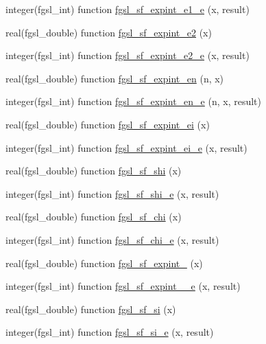 \begin{DoxyCompactItemize}
\item 
integer(fgsl\-\_\-int) function \hyperlink{specfunc_8finc_a16a9e5c0464dbb48ed274a8873ebbfda}{fgsl\-\_\-sf\-\_\-expint\-\_\-e1\-\_\-e} (x, result)
\item 
real(fgsl\-\_\-double) function \hyperlink{specfunc_8finc_ab6079b2df39d2fb6a3bfd9819f6212e6}{fgsl\-\_\-sf\-\_\-expint\-\_\-e2} (x)
\item 
integer(fgsl\-\_\-int) function \hyperlink{specfunc_8finc_a3e069fda991712e2b6351aaa26c2189a}{fgsl\-\_\-sf\-\_\-expint\-\_\-e2\-\_\-e} (x, result)
\item 
real(fgsl\-\_\-double) function \hyperlink{specfunc_8finc_a16ce71837e8b52a820deb3fab6b66a60}{fgsl\-\_\-sf\-\_\-expint\-\_\-en} (n, x)
\item 
integer(fgsl\-\_\-int) function \hyperlink{specfunc_8finc_af8874814e990349a2b3264aad080fded}{fgsl\-\_\-sf\-\_\-expint\-\_\-en\-\_\-e} (n, x, result)
\item 
real(fgsl\-\_\-double) function \hyperlink{specfunc_8finc_a048398b35a68cecd603f6eb9b631f2f9}{fgsl\-\_\-sf\-\_\-expint\-\_\-ei} (x)
\item 
integer(fgsl\-\_\-int) function \hyperlink{specfunc_8finc_af532efbc43623c9a9f75c9aef2ad2636}{fgsl\-\_\-sf\-\_\-expint\-\_\-ei\-\_\-e} (x, result)
\item 
real(fgsl\-\_\-double) function \hyperlink{specfunc_8finc_adb58b4b179f3b35d19743293daa4b686}{fgsl\-\_\-sf\-\_\-shi} (x)
\item 
integer(fgsl\-\_\-int) function \hyperlink{specfunc_8finc_ac5a4218a89f523d20b305b0dc1e1ca1b}{fgsl\-\_\-sf\-\_\-shi\-\_\-e} (x, result)
\item 
real(fgsl\-\_\-double) function \hyperlink{specfunc_8finc_ae7e5c37b2434e580f641b0e53fe96371}{fgsl\-\_\-sf\-\_\-chi} (x)
\item 
integer(fgsl\-\_\-int) function \hyperlink{specfunc_8finc_aedcf2efcc9e986772e6bdcc007ffc27a}{fgsl\-\_\-sf\-\_\-chi\-\_\-e} (x, result)
\item 
real(fgsl\-\_\-double) function \hyperlink{specfunc_8finc_a958f500a44e09d559fadac3339ce9519}{fgsl\-\_\-sf\-\_\-expint\-\_} (x)
\item 
integer(fgsl\-\_\-int) function \hyperlink{specfunc_8finc_a325507af4aa0896b4423cf73b8a5a34e}{fgsl\-\_\-sf\-\_\-expint\-\_\-\_\-e} (x, result)
\item 
real(fgsl\-\_\-double) function \hyperlink{specfunc_8finc_aa859f421d91e31ea36a969ef6d360669}{fgsl\-\_\-sf\-\_\-si} (x)
\item 
integer(fgsl\-\_\-int) function \hyperlink{specfunc_8finc_aad8bb79beecb4c68e0c47f16dae52eba}{fgsl\-\_\-sf\-\_\-si\-\_\-e} (x, result)

\end{DoxyCompactItemize}

